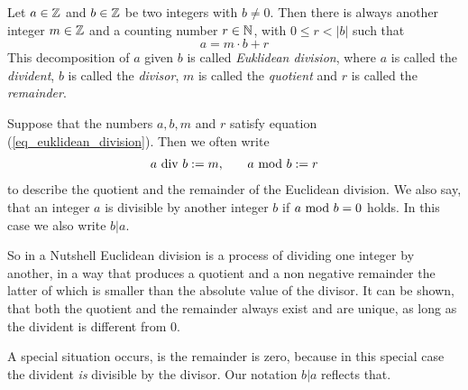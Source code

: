 Let $ a \in \mathbb{Z} $ and $ b \in \mathbb{Z} $ be two integers with $b\neq 0$. Then there is always another integer $ m \in \mathbb{Z} $ and a counting number $ r \in \mathbb{N} $, with $ 0 \leq r <|b| $ such that
\begin{equation}
\label{eq_euklidean_division}
a = m \cdot b + r
\end{equation}
This decomposition of $a$ given $b$ is called \textit{Euklidean division}, where $ a $ is called the \textit{divident}, $ b $ is called the \textit{divisor}, $m$ is called the \textit{quotient} and $r$ is called the \textit{remainder}. 
\begin{notation}
\label{eq_euklidean_division_notation}
Suppose that the numbers $ a, b, m $ and $ r $ satisfy equation (\ref{eq_euklidean_division}). Then we often write 
\begin{equation}
\label{def_integer_division_and_modulus}
\begin{array}{lcr}
a \text{ div } b: = m, & & a \text{ mod } b: = r 
\end{array}
\end{equation}
to describe the quotient and the remainder of the Euclidean division. We also say, that an integer $ a $ is divisible by another integer $ b $ if $ a \text{ mod } b = 0 $ holds. In this case we also write $ b | a $.
\end{notation}
So in a Nutshell Euclidean division is a process of dividing one integer by another, in a way that produces a quotient and a non negative remainder the latter of which is smaller than the absolute value of the divisor. It can be shown, that both the quotient and the remainder always exist and are unique, as long as the divident is different from $0$.

A special situation occurs, is the remainder is zero, because in this special case the divident \textit{is} divisible by the divisor. Our notation $b | a$ reflects that. 


